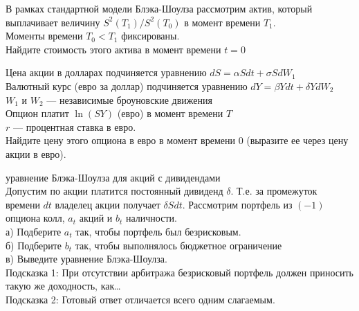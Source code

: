 \begin{solution}
\begin{solution}
\begin{solution}
\begin{solution}
\begin{solution}
\begin{solution}
\begin{solution}
\begin{solution}
\begin{solution}
\begin{solution}
\begin{solution}
\begin{solution}
\begin{solution}
\end{solution}

\begin{problem}
В рамках стандартной модели Блэка-Шоулза рассмотрим актив, который выплачивает величину $S^{2}(T_{1})/S^{2}(T_{0})$ в момент времени $T_{1}$. \\
Моменты времени $T_{0}<T_{1}$ фиксированы. \\
Найдите стоимость этого актива в момент времени $t=0$ 
\end{problem} 
\begin{solution} 

\end{solution}

\begin{problem}
Цена акции в долларах подчиняется уравнению $dS=\alpha Sdt+\sigma SdW_{1}$ \\
Валютный курс (евро за доллар) подчиняется уравнению $dY=\beta Ydt+\delta YdW_{2}$ \\
$W_{1}$ и $W_{2}$ --- независимые броуновские движения \\
Опцион платит $\ln(SY)$ (евро) в момент времени $T$ \\
$r$ --- процентная ставка в евро. \\
Найдите цену этого опциона в евро в момент времени $0$ (выразите ее через цену акции в евро). 
\end{problem} 
\begin{solution} 

\end{solution}

\begin{problem}
 уравнение Блэка-Шоулза для акций с дивидендами \\
Допустим по акции платится постоянный дивиденд $\delta$. Т.е. за промежуток времени $dt$ владелец акции получает $\delta Sdt$. Рассмотрим портфель из $(-1)$ опциона колл, $a_{t}$ акций и $b_{t}$ наличности. \\
а) Подберите $a_{t}$ так, чтобы портфель был безрисковым. \\
б) Подберите $b_{t}$ так, чтобы выполнялось бюджетное ограничение \\
в) Выведите уравнение Блэка-Шоулза. \\
Подсказка 1: При отсутствии арбитража безрисковый портфель должен приносить такую же доходность, как\ldots \\
Подсказка 2: Готовый ответ отличается всего одним слагаемым. 
\end{problem} 
\begin{solution} 


\end{solution}
\end{solution}
\end{solution}
\end{solution}
\end{solution}
\end{solution}
\end{solution}
\end{solution}
\end{solution}
\end{solution}
\end{solution}
\end{solution}
\end{solution}
